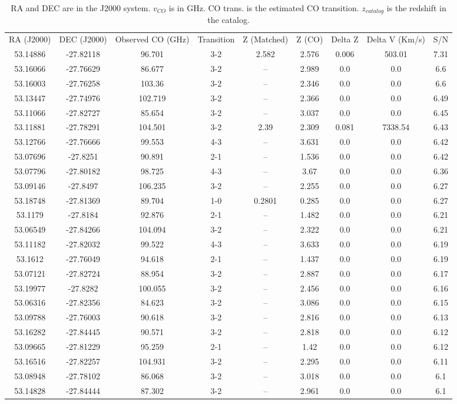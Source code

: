 \begin{table}
\centering
\caption{RA and DEC are in the J2000 system. $v_{CO}$ is in GHz. CO trans. is the estimated CO transition. $z_{catalog}$ is the redshift in the catalog. }
\begin{tabular}{ccccccccc}
RA (J2000) & DEC (J2000) & Observed CO (GHz) & Transition & Z (Matched) & Z (CO) & Delta Z & Delta V (Km/s) & S/N \\
53.14886 & -27.82118 & 96.701 & 3-2 & 2.582 & 2.576 & 0.006 & 503.01 & 7.31 \\
53.16066 & -27.76629 & 86.677 & 3-2 & -- & 2.989 & 0.0 & 0.0 & 6.6 \\
53.16003 & -27.76258 & 103.36 & 3-2 & -- & 2.346 & 0.0 & 0.0 & 6.6 \\
53.13447 & -27.74976 & 102.719 & 3-2 & -- & 2.366 & 0.0 & 0.0 & 6.49 \\
53.11066 & -27.82727 & 85.654 & 3-2 & -- & 3.037 & 0.0 & 0.0 & 6.45 \\
53.11881 & -27.78291 & 104.501 & 3-2 & 2.39 & 2.309 & 0.081 & 7338.54 & 6.43 \\
53.12766 & -27.76666 & 99.553 & 4-3 & -- & 3.631 & 0.0 & 0.0 & 6.42 \\
53.07696 & -27.8251 & 90.891 & 2-1 & -- & 1.536 & 0.0 & 0.0 & 6.42 \\
53.07796 & -27.80182 & 98.725 & 4-3 & -- & 3.67 & 0.0 & 0.0 & 6.36 \\
53.09146 & -27.8497 & 106.235 & 3-2 & -- & 2.255 & 0.0 & 0.0 & 6.27 \\
53.18748 & -27.81369 & 89.704 & 1-0 & 0.2801 & 0.285 & 0.0 & 0.0 & 6.27 \\
53.1179 & -27.8184 & 92.876 & 2-1 & -- & 1.482 & 0.0 & 0.0 & 6.21 \\
53.06549 & -27.84266 & 104.094 & 3-2 & -- & 2.322 & 0.0 & 0.0 & 6.21 \\
53.11182 & -27.82032 & 99.522 & 4-3 & -- & 3.633 & 0.0 & 0.0 & 6.19 \\
53.1612 & -27.76049 & 94.618 & 2-1 & -- & 1.437 & 0.0 & 0.0 & 6.19 \\
53.07121 & -27.82724 & 88.954 & 3-2 & -- & 2.887 & 0.0 & 0.0 & 6.17 \\
53.19977 & -27.8282 & 100.055 & 3-2 & -- & 2.456 & 0.0 & 0.0 & 6.16 \\
53.06316 & -27.82356 & 84.623 & 3-2 & -- & 3.086 & 0.0 & 0.0 & 6.15 \\
53.09788 & -27.76003 & 90.618 & 3-2 & -- & 2.816 & 0.0 & 0.0 & 6.13 \\
53.16282 & -27.84445 & 90.571 & 3-2 & -- & 2.818 & 0.0 & 0.0 & 6.12 \\
53.09665 & -27.81229 & 95.259 & 2-1 & -- & 1.42 & 0.0 & 0.0 & 6.12 \\
53.16516 & -27.82257 & 104.931 & 3-2 & -- & 2.295 & 0.0 & 0.0 & 6.11 \\
53.08948 & -27.78102 & 86.068 & 3-2 & -- & 3.018 & 0.0 & 0.0 & 6.1 \\
53.14828 & -27.84444 & 87.302 & 3-2 & -- & 2.961 & 0.0 & 0.0 & 6.1 \\
\end{tabular}
\end{table}\label{table:Catalog}

